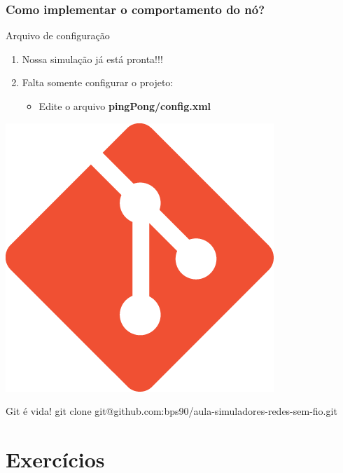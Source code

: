 \documentclass{beamer}
\begin{document}
\begin{frame}
	\frametitle{Como implementar o comportamento do nó?}
	
	\begin{block}{Arquivo de configuração}
		\begin{enumerate}
			\item Nossa simulação já está pronta!!!
			\item Falta somente configurar o projeto:
			\begin{itemize}
				\item Edite o arquivo \textbf{pingPong/config.xml}
			\end{itemize}
		\end{enumerate}
	\end{block}	
	
	
\end{frame}

\begin{frame}
\tiny
	
\end{frame}

\begin{frame}
\footnotesize
\centering

	\includegraphics[width=0.22\linewidth]{img/git.png}
	\begin{exampleblock}{Git é vida!}
		git clone git@github.com:bps90/aula-simuladores-redes-sem-fio.git
	\end{exampleblock}
	
\end{frame}
\section{Exercícios} %
\end{document}

